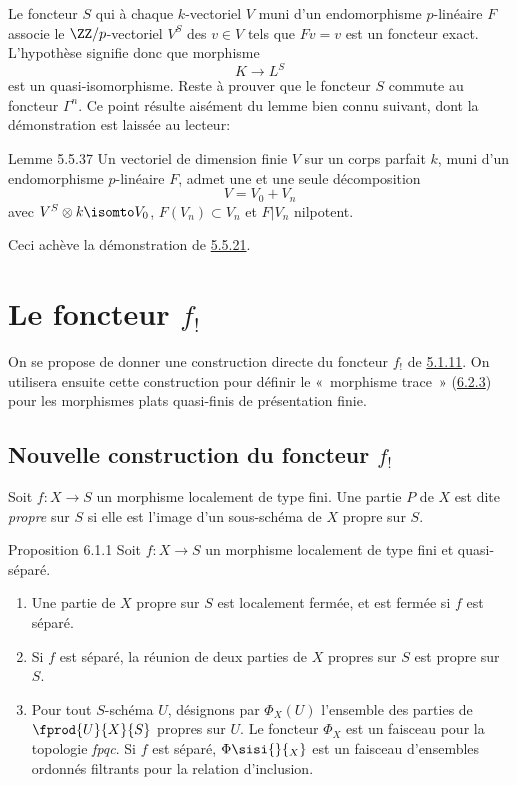 Le foncteur $S$ qui à chaque $k$-vectoriel $V$ muni d'un endomorphisme
$p$-linéaire $F$ associe le $\ZZ/p$-vectoriel $V^{S}$ des $v\in
V$ tels que $Fv=v$ est un foncteur exact. L'hypothèse signifie donc
que morphisme
$$
K\longrightarrow L^{S}
$$
est un quasi-isomorphisme. Reste à prouver que le foncteur $S$ commute
au foncteur $\Gamma^{n}$. Ce point résulte aisément du lemme bien
connu suivant, dont la démonstration est laissée au lecteur:

\begin{enonce*}{Lemme 5.5.37}
Un vectoriel de dimension finie $V$ sur un corps parfait $k$, muni
d'un endomorphisme $p$-linéaire $F$, admet une et une seule
décomposition
$$
V=V_{0}+V_{n}
$$
avec $V^{S}\otimes k\isomto  V_{0}$, $F(V_{n})\subset V_{n}$
et $F|V_{n}$ nilpotent.
\end{enonce*}

Ceci achève la démonstration de \hyperref[XVII.thm5.5.21]{5.5.21}.

\section[Le foncteur $f_{!}$]{Le foncteur $f_{!}$}\pageoriginale

On se propose de donner une construction directe du foncteur $f_{!}$
de \hyperref[XVII.var5.1.11]{5.1.11}. On utilisera ensuite cette construction pour définir le « morphisme trace »  (\hyperref[XVII.thm6.2.3]{6.2.3}) pour les morphismes plats quasi-finis de
présentation finie.

\subsection[Nouvelle construction du foncteur $f_{!}$]{Nouvelle construction du foncteur $f_{!}$}

Soit $f:X\rightarrow S$ un morphisme localement de type fini. Une
partie $P$ de $X$ est dite \emph{propre} sur $S$ si elle est l'image
d'un sous-schéma de $X$ propre sur $S$.

\begin{enonce*}{Proposition 6.1.1}
Soit $f:X\rightarrow S$ un morphisme localement de type fini et
quasi-séparé.
\begin{enumerate}
\renewcommand{\theenumi}{\roman{enumi}}
\renewcommand{\labelenumi}{(\theenumi)}
\item Une partie de $X$ propre sur $S$ est localement fermée, et est
fermée si $f$ est séparé.

\item Si $f$ est séparé, la réunion de deux parties de $X$ propres sur
$S$ est propre sur $S$.

\item Pour tout $S$-schéma $U$, désignons par $\Phi_{X}(U)$ l'ensemble
des parties de $\fprod{U}{X}{S}$ propres sur $U$. Le foncteur
$\Phi_{X}$ est un faisceau pour la topologie \emph{fpqc}. Si $f$ est
séparé, $\Phi\sisi{}{_X}$ est un faisceau d'ensembles ordonnés filtrants pour la
relation d'inclusion.
\end{enumerate}
\end{enonce*}

